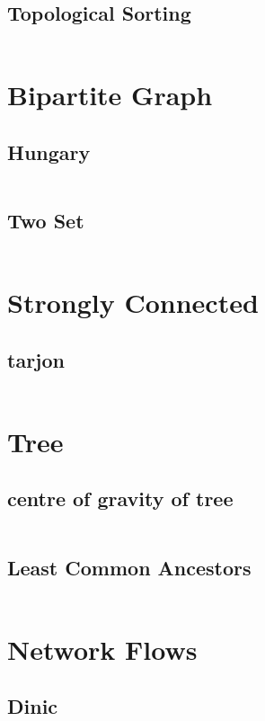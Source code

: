 \documentclass[a4paper,10pt]{article}
\begin{document}
			\subsection{Topological Sorting}
				\inputminted[breaklines]{c++}{graph/Topological-Sorting.cc}
		
		\newpage
		\section{Bipartite Graph}
			\subsection{Hungary}
				\inputminted[breaklines]{c++}{graph/Bipartite_Graph.cc}
			\subsection{Two Set}
				\inputminted[breaklines]{c++}{graph/Two-set.cc}

		\newpage
		\section{Strongly Connected}
			\subsection{tarjon}
				\inputminted[breaklines]{c++}{graph/Strongly_Connected.cc}
		
		\newpage
		\section{Tree}
			\subsection{centre of gravity of tree}
				\inputminted[breaklines]{c++}{graph/centre_of_gravity_of_tree.cc}
             \newpage
			\subsection{Least Common Ancestors}
				\inputminted[breaklines]{c++}{graph/lca.cc}
		\section{Network Flows}
			\subsection{Dinic}
				\inputminted[breaklines]{c++}{graph/dinic.cc}
\end{document}
